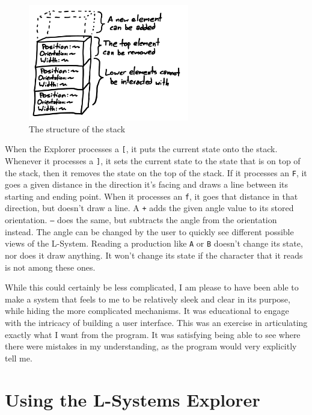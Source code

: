 \documentclass[12pt,twoside]{reedthesis}
\newcommand{\code}[1]{\texttt{#1}}
\begin{document}
	
	\begin{figure}[H]
	\centering
	\includegraphics[height=2in, frame]{Images/Diagram12}
	\caption{The structure of the stack}
	\label {Stack}
	\end{figure}
	
	When the Explorer processes a \code{[}, it puts the current state onto the stack. Whenever it processes a \code{]}, it sets the current state to the state that is on top of the stack, then it removes the state on the top of the stack. If it processes an \code{F}, it goes a given distance in the direction it's facing and draws a line between its starting and ending point. When it processes an \code{f}, it goes that distance in that direction, but doesn't draw a line. A \code{+} adds the given angle value to its stored orientation. \code{–} does the same, but subtracts the angle from the orientation instead. The angle can be changed by the user to quickly see different possible views of the L-System. Reading a production like \code{A} or \code{B} doesn't change its state, nor does it draw anything. It won't change its state if the character that it reads is not among these ones.
	
	While this could certainly be less complicated, I am please to have been able to make a system that feels to me to be relatively sleek and clear in its purpose, while hiding the more complicated mechanisms. It was educational to engage with the intricacy of building a user interface. This was an exercise in articulating exactly what I want from the program. It was satisfying being able to see where there were mistakes in my understanding, as the program would very explicitly tell me.

\section{Using the L-Systems Explorer}
\label{Using-the-L-Systems-Explorer}
\end{document}
